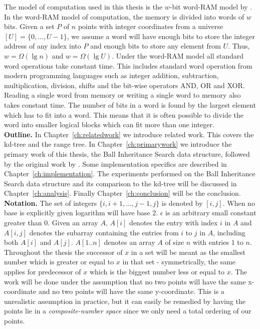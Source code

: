 The model of computation used in this thesis is the $w$-bit word-RAM model by \citet{fredman}. In the word-RAM model of computation, the memory is divided into words of $w$ bits. Given a set $P$ of $n$ points with integer coordinates from a universe $[U] = \{0, \dotsc, U-1\}$, we assume a word will have enough bits to store the integer address of any index into $P$ and enough bits to store any element from $U$. Thus, $w = \Omega(\lg n)$ and $w = \Omega(\lg U)$. Under the word-RAM model all standard word operations take constant time. This includes standard word operation from modern programming languages such as integer addition, subtraction, multiplication, division, shifts and the bit-wise operators AND, OR and XOR. Reading a single word from memory or writing a single word to memory also takes constant time. The number of bits in a word is found by the largest element which has to fit into a word. This means that it is often possible to divide the word into smaller logical blocks which can fit more than one integer. \\ 


\noindent \textbf{Outline.} In Chapter~\ref{ch:relatedwork} we introduce related work. This covers the kd-tree and the range tree. In Chapter~\ref{ch:primarywork} we introduce the primary work of this thesis, the Ball Inheritance Search data structure, followed by the original work by \citet{chanetal}. Some implementation specifics are described in Chapter~\ref{ch:implementation}. The experiments performed on the Ball Inheritance Search data structure and its comparison to the kd-tree will be discussed in Chapter~\ref{ch:analysis}. Finally Chapter~\ref{ch:conclusion} will be the conclusion.  \\

\noindent \textbf{Notation.} The set of integers $\{i, i+1, \dotsc, j-1, j\}$ is denoted by $[i,j]$. When no base is explicitly given logarithm will have base $2$. $\epsilon$ is an arbitrary small constant greater than $0$. Given an array $A$, $A[i]$ denotes the entry with index $i$ in $A$ and $A[i,j]$ denotes the subarray containing the entries from $i$ to $j$ in $A$, including both $A[i]$ and $A[j]$. $A[1..n]$ denotes an array $A$ of size $n$ with entries $1$ to $n$. Throughout the thesis the successor of $x$ in a set will be meant as the smallest number which is greater or equal to $x$ in that set - symmetrically, the same applies for predecessor of $x$ which is the biggest number less or equal to $x$. The work will be done under the assumption that no two points will  have the same x-coordinate and no two points will have the same y-coordinate. This is a unrealistic assumption in practice, but it can easily be remedied by having the points lie in a \emph{composite-number space} since we only need a total ordering of our points.



